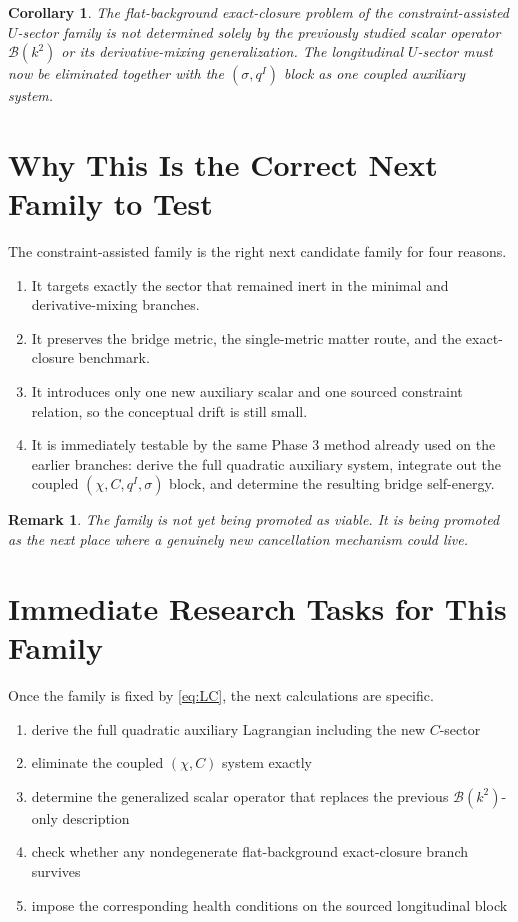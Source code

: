 \documentclass[11pt]{article}
\newtheorem{remark}{Remark}
\newtheorem{corollary}{Corollary}
\begin{document}
\begin{corollary}
The flat-background exact-closure problem of the constraint-assisted \(U\)-sector family is not determined solely by the previously studied scalar operator \(\mathcal B(k^2)\) or its derivative-mixing generalization. The longitudinal \(U\)-sector must now be eliminated together with the \((\sigma,q^I)\) block as one coupled auxiliary system.
\end{corollary}

\section{Why This Is the Correct Next Family to Test}

The constraint-assisted family is the right next candidate family for four reasons.
\begin{enumerate}
    \item It targets exactly the sector that remained inert in the minimal and derivative-mixing branches.
    \item It preserves the bridge metric, the single-metric matter route, and the exact-closure benchmark.
    \item It introduces only one new auxiliary scalar and one sourced constraint relation, so the conceptual drift is still small.
    \item It is immediately testable by the same Phase 3 method already used on the earlier branches: derive the full quadratic auxiliary system, integrate out the coupled \((\chi,C,q^I,\sigma)\) block, and determine the resulting bridge self-energy.
\end{enumerate}

\begin{remark}
The family is not yet being promoted as viable. It is being promoted as the next place where a genuinely new cancellation mechanism could live.
\end{remark}

\section{Immediate Research Tasks for This Family}

Once the family is fixed by \eqref{eq:LC}, the next calculations are specific.
\begin{enumerate}
    \item derive the full quadratic auxiliary Lagrangian including the new \(C\)-sector
    \item eliminate the coupled \((\chi,C)\) system exactly
    \item determine the generalized scalar operator that replaces the previous \(\mathcal B(k^2)\)-only description
    \item check whether any nondegenerate flat-background exact-closure branch survives
    \item impose the corresponding health conditions on the sourced longitudinal block
\end{enumerate}
\end{document}
